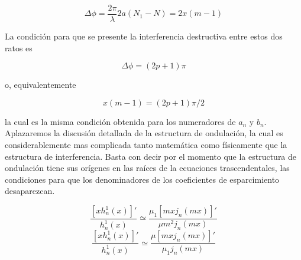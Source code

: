 \documentclass[11pt]{article}
\begin{document}
\begin{equation}
    \Delta \phi = \frac{2\pi}{\lambda}2a(N_{1}-N)=2x(m-1)
\end{equation}

La condición para que se presente la interferencia destructiva entre estos dos ratos es 

\begin{equation}
    \Delta \phi = (2p+1)\pi 
\end{equation}

o, equivalentemente 

\begin{equation}
    x(m-1)=(2p+1)\pi/2
\end{equation}

la cual es la misma condición obtenida para los numeradores de $a_{n}$ y $b_{n}$. 
Aplazaremos la discusión detallada de la estructura de ondulación, la cual es considerablemente mas complicada tanto matemática como físicamente que la estructura de interferencia. Basta con decir por el momento que la estructura de ondulación tiene sus orígenes en las raíces de la ecuaciones trascendentales, las condiciones para que los denominadores de los coeficientes de esparcimiento desaparezcan.

\begin{equation}
\frac{[xh_{n}^{1}(x)]'}{h_{n}^{1}(x)}\simeq \frac{\mu_{1}[mxj_{n}(mx)]'}{\mu m^2 j_{n}(mx)}
\end{equation}
\begin{equation}
\frac{[xh_{n}^{1}(x)]'}{h_{n}^{1}(x)}\simeq \frac{\mu [mxj_{n}(mx)]'}{\mu_{1} j_{n}(mx)}
\end{equation}
\end{document}
